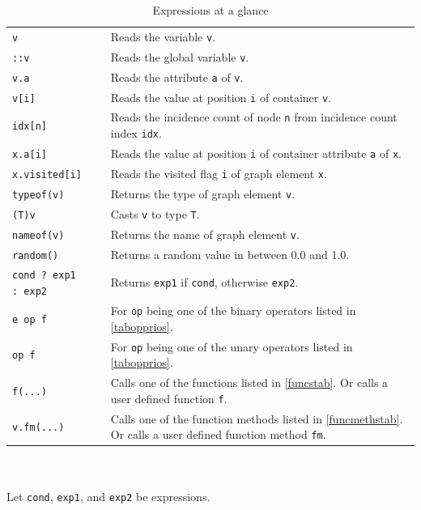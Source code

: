 \begin{table}[htbp]
\begin{minipage}{\linewidth} \renewcommand{\footnoterule}{} 
\begin{tabularx}{\linewidth}{|lX|}
\hline
\texttt{v}	& Reads the variable \texttt{v}. \\
\texttt{::v}	& Reads the global variable \texttt{v}. \\
\texttt{v.a} & Reads the attribute \texttt{a} of \texttt{v}.\\
\texttt{v[i]} & Reads the value at position \texttt{i} of container \texttt{v}.\\
\texttt{idx[n]} & Reads the incidence count of node \texttt{n} from incidence count index \texttt{idx}.\\
\texttt{x.a[i]} & Reads the value at position \texttt{i} of container attribute \texttt{a} of \texttt{x}.\\
\texttt{x.visited[i]} & Reads the visited flag \texttt{i} of graph element \texttt{x}.\\
\hline
\texttt{typeof(v)}	& Returns the type of graph element \texttt{v}. \\
\texttt{(T)v}	& Casts \texttt{v} to type \texttt{T}. \\
\texttt{nameof(v)}	& Returns the name of graph element \texttt{v}. \\
\texttt{random()}	& Returns a random value in between 0.0 and 1.0. \\
\hline
\texttt{cond ? exp1 :~exp2}	& Returns \texttt{exp1} if \texttt{cond}, otherwise \texttt{exp2}. \\
\texttt{e op f}	& For \texttt{op} being one of the binary operators listed in \ref{tabopprios}. \\
\texttt{op f}	& For \texttt{op} being one of the unary operators listed in \ref{tabopprios}. \\
\hline
\texttt{f(...)}	& Calls one of the functions listed in \ref{funcstab}. Or calls a user defined function \texttt{f}. \\
\texttt{v.fm(...)}	& Calls one of the function methods listed in \ref{funcmethstab}. Or calls a user defined function method \texttt{fm}.\\
\hline
\end{tabularx}
\end{minipage}\\
\\ 
{\small Let \texttt{cond}, \texttt{exp1}, and \texttt{exp2} be expressions.}
\caption{Expressions at a glance}
\label{expressionstab}
\end{table}

